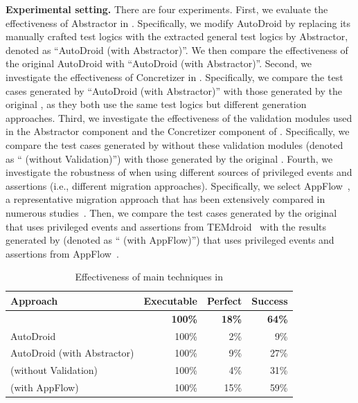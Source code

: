 \textbf{Experimental setting.} There are four experiments.
First, we evaluate the effectiveness of Abstractor in \toolNameSmall{}. Specifically, we modify AutoDroid by replacing its manually crafted test logics with the extracted general test logics by Abstractor, denoted as ``AutoDroid (with Abstractor)''. We then compare the effectiveness of the original AutoDroid with ``AutoDroid (with Abstractor)''.
Second, we investigate the effectiveness of Concretizer in \toolNameSmall{}. 
Specifically, we compare the test cases generated by ``AutoDroid (with Abstractor)'' with those generated by the original \toolNameSmall{}, as they both use the same test logics but different generation approaches.
Third, we investigate the effectiveness of the validation modules used in the Abstractor component and the Concretizer component of \toolNameSmall{}. 
Specifically, we compare the test cases generated by \toolNameSmall{} without these validation modules (denoted as ``\toolNameSmall{} (without Validation)'') with those generated by the original \toolNameSmall{}.
Fourth, we investigate the robustness of \toolNameSmall{} when using different sources of privileged events and assertions (i.e., different migration approaches). 
Specifically, we select AppFlow~\cite{hu2018appflow}, a representative migration approach that has been extensively compared in numerous studies~\cite{zhao2020fruiter, zhang2024learning, mariani2021semantic}.
Then, we compare the test cases generated by the original \toolNameSmall{} that uses privileged events and assertions from TEMdroid~\cite{zhang2024learning} with the results generated by \toolNameSmall{} (denoted as ``\toolNameSmall{} (with AppFlow)'') that uses privileged events and assertions from AppFlow~\cite{hu2018appflow}.






\begin{table}[t]
  \centering
  \caption{Effectiveness of main techniques in \toolNameSmall{}}
    \begin{tabular}{l|r|r|r}
    \toprule
    \textbf{Approach} & \multicolumn{1}{l|}{\textbf{Executable}} & \multicolumn{1}{l|}{\textbf{Perfect}} & \multicolumn{1}{l}{\textbf{Success}} \\
    \midrule
    \toolNameSmall{} & \textbf{100\%} & \textbf{18\%}  & \textbf{64\%} \\
    AutoDroid & 100\% & 2\%   & 9\% \\
    \midrule
    AutoDroid (with Abstractor) & 100\% & 9\%   & 27\% \\
    \toolNameSmall{} (without Validation) & 100\% & 4\%   & 31\% \\
    \toolNameSmall{} (with AppFlow) & 100\% & 15\%  & 59\% \\
    \bottomrule
    \end{tabular}%
  \label{tab:ablation-study}%
\end{table}%

